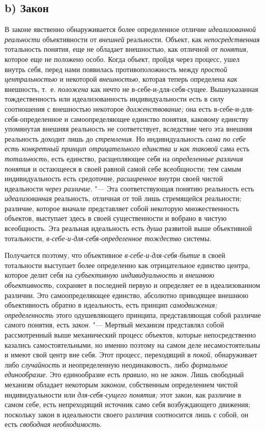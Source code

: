 \subsection[b) Закон]{b) Закон}
В законе явственно обнаруживается более определенное отличие
{\em идеализованной реальности}
объективности от
{\em внешней} реальности.
Объект, как {\em непосредственная}
тотальность понятия, еще не обладает внешностью, как отличной
от {\em понятия}, которое
еще не положено особо. Когда объект, пройдя через процесс, ушел внутрь
себя, перед нами появилась противоположность между
{\em простой центральностью}
и некоторой
{\em внешностью}, которая
теперь определена {\em как}
внешность, т.~е.
{\em положена} как нечто
не в-себе-и-для-себя-сущее. Вышеуказанная тождественность или
идеализованность индивидуальности есть в силу соотношения с внешностью
некоторое {\em долженствование;}
она есть в-себе-и-для-себя-определенное и самоопределяющее
единство понятия, каковому единству упомянутая внешняя реальность не
соответствует, вследствие чего эта внешняя реальность доходит лишь до
{\em стремления}. Но
индивидуальность {\em сама по себе есть
конкретный принцип отрицательного единства и как таковой}
сама есть
{\em тотальность}, есть
единство, расщепляющее себя на
{\em определенные различия понятия}
и остающееся в своей равной самой себе всеобщности; тем самым
индивидуальность есть средоточие,
{\em расширенное} внутри
своей чистой идеальности {\em через
различие}. "--- Эта соответствующая понятию реальность есть
{\em идеализованная}
реальность, отличная от той лишь стремящейся реальности;
различие, которое вначале представляет собой некоторую множественность
объектов, выступает здесь в своей существенности и вобрано в чистую
всеобщность. Эта реальная идеальность есть
{\em душа} развитой выше
объективной тотальности,
{\em в-себе-и-для-себя-определенное
тождество} системы.

Получается поэтому, что объективное
{\em в-себе-и-для-себя-бытие}
в своей тотальности выступает более определенно как
отрицательное единство центра, которое делит себя на
{\em субъективную индивидуальность}
и {\em внешнюю
объективность}, сохраняет в последней первую и определяет ее
в идеализованном различии. Это самоопределяющее единство, абсолютно
приводящее внешнюю объективность обратно в идеальность, есть принцип
{\em самодвижения;}
{\em определенность} этого
одушевляющего принципа, представляющая собой различие самого понятия, есть
{\em закон}. "--- Мертвый
механизм представлял собой рассмотренный выше механический
процесс объектов, которые непосредственно казались самостоятельными, но
именно поэтому на самом деле несамостоятельны и имеют свой центр вне себя.
Этот процесс, переходящий в
{\em покой}, обнаруживает
либо {\em случайность} и
неопределенную неодинаковость, либо
{\em формальное единообразие}.
Это единообразие есть
{\em правило}, но не
{\em закон}. Лишь
свободный механизм обладает некоторым
{\em законом},
собственным определением чистой индивидуальности или
{\em для-себя-сущего понятия;}
этот закон, как различие в самом себе, есть непреходящий
источник само себя возбуждающего движения; поскольку закон в идеальности
своего различия соотносится лишь с собой, он есть
{\em свободная необходимость}.

